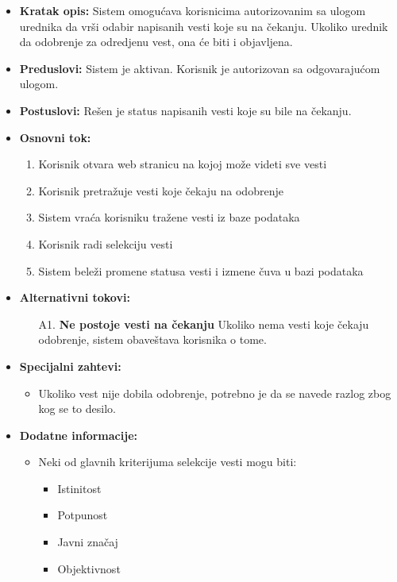 \documentclass{article}
\begin{document}
\begin{itemize}
    \item \textbf{Kratak opis:} Sistem omogućava korisnicima autorizovanim sa ulogom urednika da vrši odabir napisanih vesti koje su na čekanju. Ukoliko urednik da odobrenje za odredjenu vest, ona će biti i objavljena.
    \item \textbf{Preduslovi:} Sistem je aktivan. Korisnik je autorizovan sa odgovarajućom ulogom. 
    \item \textbf{Postuslovi:} Rešen je status napisanih vesti koje su bile na čekanju.
    \item \textbf{Osnovni tok:}
        \begin{enumerate}
            \item Korisnik otvara web stranicu na kojoj može videti sve vesti
            \item Korisnik pretražuje vesti koje čekaju na odobrenje
            \item Sistem vraća korisniku tražene vesti iz baze podataka
            \item Korisnik radi selekciju vesti
            \item Sistem beleži promene statusa vesti i izmene čuva u bazi podataka
        \end{enumerate}
    \item \textbf{Alternativni tokovi:}
        \begin{itemize}
            \item[A1.] \textbf{Ne postoje vesti na čekanju} Ukoliko nema vesti koje čekaju odobrenje, sistem obaveštava korisnika o tome. 
        \end{itemize}
    \item \textbf{Specijalni zahtevi:}
        \begin{itemize}
			\item Ukoliko vest nije dobila odobrenje, potrebno je da se navede razlog zbog kog se to desilo.
		\end{itemize}
	\item \textbf{Dodatne informacije:}
        \begin{itemize}
            \item Neki od glavnih kriterijuma selekcije vesti mogu biti:
                \begin{itemize}
                    \item Istinitost
                    \item Potpunost
                    \item Javni značaj 
                    \item Objektivnost
                \end{itemize}
        \end{itemize}
\end{itemize}
\end{document}

